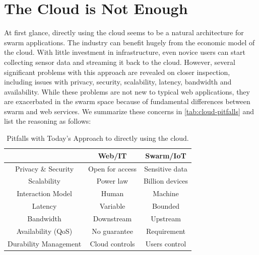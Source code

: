 \section{The Cloud is Not Enough}
\label{sec:cloud-not-enough}

At first glance, directly using the cloud seems to be a natural architecture for
swarm applications. The industry can benefit hugely from the economic model of
the cloud. With little investment in infrastructure, even novice users can start
collecting sensor data and streaming it back to the cloud. However, several
significant problems with this approach are revealed on closer inspection,
including issues with privacy, security, scalability, latency, bandwidth and
availability.  While these problems are not new to typical web applications,
they are exacerbated in the swarm space because of fundamental differences
between swarm and web services. We summarize these concerns in
\autoref{tab:cloud-pitfalls} and list the reasoning as follows:

\begin{table}
  \centering
  \begin{tabular}{c c c}
    \toprule
    & Web/IT & Swarm/IoT \\
    \midrule
    Privacy \& Security & Open for access & Sensitive data \\
    Scalability & Power law & Billion devices \\
    Interaction Model & Human & Machine \\
    Latency & Variable & Bounded  \\
    Bandwidth & Downstream & Upstream   \\
    Availability (QoS) & No guarantee & Requirement  \\
    Durability Management & Cloud controls & Users control \\
    \bottomrule
  \end{tabular}
  \caption{Pitfalls with Today's Approach to directly using the cloud.}
  \label{tab:cloud-pitfalls}
\end{table}

